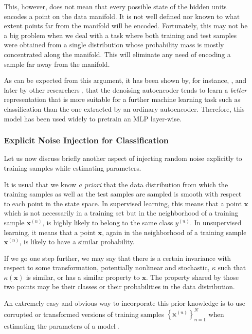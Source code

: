 \documentclass[dissertation,nocontribution,draft*]{aaltoseries}
\newcommand{\vect}[1]{\mathbf{#1}}
\newcommand{\vx}[0]{\vect{x}}
\begin{document}
This, however, does not mean that every possible state of
the hidden units encodes a point on the data manifold. It is
not well defined nor known to what extent points far from the
manifold will be encoded. Fortunately, this may not be a big
problem when we deal with a task where both training and
test samples were obtained from a single
distribution whose probability mass is mostly concentrated
along the manifold. This will eliminate any need of encoding
a sample far away from the manifold.

As can be expected from this argument, it has been shown by,
for instance, \citet{Vincent2010}, and later by other
researchers \citep[see, e.g.,][and references therein]{Bengio2009a}, that the
denoising autoencoder tends to learn a \textit{better}
representation that is more suitable for a further machine
learning task such as classification than the one extracted
by an ordinary autoencoder. Therefore, this model
has been used widely to pretrain an MLP layer-wise.

\subsubsection{Explicit Noise Injection for Classification}
\label{sec:noise_injection}

Let us now discuss briefly another aspect of injecting random
noise explicitly to training samples while estimating
parameters.

It is usual that we know \textit{a priori} that the data
distribution from which the training samples as well as
the test samples are sampled is smooth with respect to each
point in the state space. In supervised learning, this
means that a point $\vx$ which is not necessarily in a
training set but in the neighborhood of a training sample
$\vx^{(n)}$, is highly likely to belong to the same class
$y^{(n)}$. In unsupervised learning, it means that a point
$\vx$, again in the neighborhood of a training sample
$\vx^{(n)}$, is likely to have a similar probability.

If we go one step further, we may say that there is a
certain invariance with respect to some transformation,
potentially nonlinear and stochastic, $\kappa$ such that
$\kappa(\vx)$ is similar, or has a similar property to
$\vx$. The property shared by those two points may be their
classes or their probabilities in the data distribution.

An extremely easy and obvious way to incorporate this prior
knowledge is to use corrupted or transformed versions of
training samples $\left\{ \vx^{(n)} \right\}_{n=1}^N$ when
estimating the parameters of a model \citep[see,
e.g.,][Chapter 5.5]{Bishop2006}. 
\end{document}
